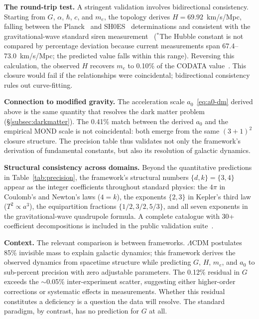 \documentclass[aps,prd,preprint,superscriptaddress,showpacs,preprintnumbers,amsmath,amssymb,nofootinbib]{revtex4-2}
\begin{document}
\textbf{The round-trip test.} A stringent validation involves bidirectional consistency. Starting from $G$, $\alpha$, $\hbar$, $c$, and $m_e$, the topology derives $H = 69.92$~km/s/Mpc, falling between the Planck~\cite{planck2020} and SH0ES~\cite{riess2022} determinations and consistent with the gravitational-wave standard siren measurement~\cite{gw170817} (${}^*$The Hubble constant is not compared by percentage deviation because current measurements span 67.4--73.0~km/s/Mpc; the predicted value falls within this range). Reversing this calculation, the observed $H$ recovers $m_e$ to 0.10\% of the CODATA value~\cite{codata2022}. This closure would fail if the relationships were coincidental; bidirectional consistency rules out curve-fitting.

\textbf{Connection to modified gravity.} The acceleration scale $a_0$~\eqref{eq:a0-dm} derived above is the same quantity that resolves the dark matter problem (\S\ref{subsec:darkmatter}). The 0.41\% match between the derived $a_0$ and the empirical MOND scale is not coincidental: both emerge from the same $(3+1)^2$ closure structure. The precision table thus validates not only the framework's derivation of fundamental constants, but also its resolution of galactic dynamics.

\textbf{Structural consistency across domains.} Beyond the quantitative predictions in Table~\ref{tab:precision}, the framework's structural numbers $\{d, k\} = \{3, 4\}$ appear as the integer coefficients throughout standard physics: the $4\pi$ in Coulomb's and Newton's laws ($4 = k$), the exponents $\{2, 3\}$ in Kepler's third law ($T^2 \propto a^3$), the equipartition fractions $\{1/2, 3/2, 5/3\}$, and all seven exponents in the gravitational-wave quadrupole formula. A complete catalogue with 30+ coefficient decompositions is included in the public validation suite~\cite{gfm-repo}.

\textbf{Context.} The relevant comparison is between frameworks. $\Lambda$CDM postulates 85\% invisible mass to explain galactic dynamics; this framework derives the observed dynamics from spacetime structure while predicting $G$, $H$, $m_e$, and $a_0$ to sub-percent precision with zero adjustable parameters. The 0.12\% residual in $G$ exceeds the $\sim$0.05\% inter-experiment scatter, suggesting either higher-order corrections or systematic effects in measurements. Whether this residual constitutes a deficiency is a question the data will resolve. The standard paradigm, by contrast, has no prediction for $G$ at all.
\end{document}
